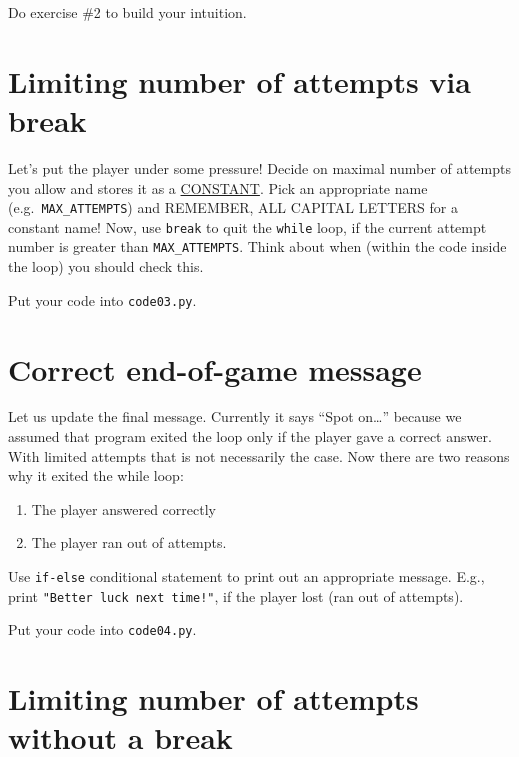 \documentclass[
]{book}
\providecommand{\tightlist}{%
  \setlength{\itemsep}{0pt}\setlength{\parskip}{0pt}}
\begin{document}
Do exercise \#2 to build your intuition.

\hypertarget{limiting-number-of-attempts-via-break}{%
\section{Limiting number of attempts via break}\label{limiting-number-of-attempts-via-break}}

Let's put the player under some pressure! Decide on maximal number of attempts you allow and stores it as a \protect\hyperlink{constants}{CONSTANT}. Pick an appropriate name (e.g.~\texttt{MAX\_ATTEMPTS}) and REMEMBER, ALL CAPITAL LETTERS for a constant name! Now, use \texttt{break} to quit the \texttt{while} loop, if the current attempt number is greater than \texttt{MAX\_ATTEMPTS}. Think about when (within the code inside the loop) you should check this.

Put your code into \texttt{code03.py}.

\hypertarget{correct-end-of-game-message}{%
\section{Correct end-of-game message}\label{correct-end-of-game-message}}

Let us update the final message. Currently it says ``Spot on\ldots{}'' because we assumed that program exited the loop only if the player gave a correct answer. With limited attempts that is not necessarily the case. Now there are two reasons why it exited the while loop:

\begin{enumerate}
\def\labelenumi{\arabic{enumi}.}
\tightlist
\item
  The player answered correctly
\item
  The player ran out of attempts.
\end{enumerate}

Use \texttt{if-else} conditional statement to print out an appropriate message. E.g., print \texttt{"Better\ luck\ next\ time!"}, if the player lost (ran out of attempts).

Put your code into \texttt{code04.py}.

\hypertarget{limiting-number-of-attempts-without-a-break}{%
\section{Limiting number of attempts without a break}\label{limiting-number-of-attempts-without-a-break}}
\end{document}
